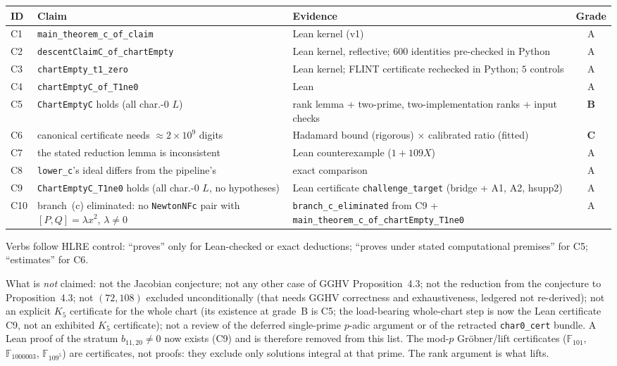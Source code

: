 \documentclass[a4paper,11pt]{article}
\theoremstyle{plain}
\theoremstyle{definition}
\theoremstyle{remark}
\begin{document}
{\small
\begin{center}
\begin{tabular}{llp{5.2cm}c}
\toprule
\textbf{ID} & \textbf{Claim} & \textbf{Evidence} & \textbf{Grade} \\
\midrule
C1 & \texttt{main\_theorem\_c\_of\_claim} & Lean kernel (v1) & A \\
C2 & \texttt{descentClaimC\_of\_chartEmpty} & Lean kernel, reflective; $600$ identities pre-checked in Python & A \\
C3 & \texttt{chartEmpty\_t1\_zero} & Lean kernel; FLINT certificate rechecked in Python; $5$ controls & A \\
C4 & \texttt{chartEmptyC\_of\_T1ne0} & Lean & A \\
C5 & \texttt{ChartEmptyC} holds (all char.-$0$ $L$) & rank lemma + two-prime, two-implementation ranks + input checks & \textbf{B} \\
C6 & canonical certificate needs $\approx2\times10^9$ digits & Hadamard bound (rigorous) $\times$ calibrated ratio (fitted) & \textbf{C} \\
C7 & the stated reduction lemma is inconsistent & Lean counterexample ($1+109X$) & A \\
C8 & \texttt{lower\_c}'s ideal differs from the pipeline's & exact comparison & A \\
C9 & \texttt{ChartEmptyC\_T1ne0} holds (all char.-$0$ $L$, no hypotheses) & Lean certificate \texttt{challenge\_target} (bridge + A1, A2, hsupp2) & A \\
C10 & branch~(c) eliminated: no \texttt{NewtonNFc} pair with $[P,Q]=\lambda x^2$, $\lambda\ne0$ & \texttt{branch\_c\_eliminated} from C9 + \texttt{main\_theorem\_c\_of\_chartEmpty\_T1ne0} & A \\
\bottomrule
\end{tabular}
\end{center}
}
\label{bc:tab:grades}

Verbs follow HLRE control: ``proves'' only for Lean-checked or exact deductions; ``proves under stated computational premises'' for C5; ``estimates'' for C6.

What is \emph{not} claimed: not the Jacobian conjecture; not any other case of GGHV Proposition~4.3; not the reduction from the conjecture to Proposition~4.3; not $(72,108)$ excluded unconditionally (that needs GGHV correctness and exhaustiveness, ledgered not re-derived); not an explicit $K_5$ certificate for the whole chart (its existence at grade~B is C5; the load-bearing whole-chart step is now the Lean certificate C9, not an exhibited $K_5$ certificate); not a review of the deferred single-prime $p$-adic argument or of the retracted \texttt{char0\_cert} bundle. A Lean proof of the stratum $b_{11,20}\ne0$ now exists (C9) and is therefore removed from this list. The mod-$p$ Gr\"obner/lift certificates ($\mathbb{F}_{101}$, $\mathbb{F}_{1000003}$, $\mathbb{F}_{109^5}$) are certificates, not proofs: they exclude only solutions integral at that prime. The rank argument is what lifts.
\end{document}

